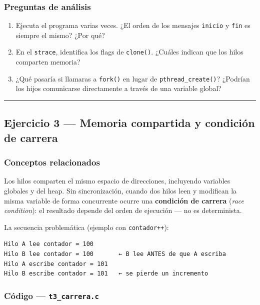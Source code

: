 \documentclass[
  spanish,
]{article}
\providecommand{\tightlist}{%
  \setlength{\itemsep}{0pt}\setlength{\parskip}{0pt}}
\begin{document}
\subsubsection{Preguntas de análisis}\label{preguntas-de-anuxe1lisis-1}

\begin{enumerate}
\def\labelenumi{\arabic{enumi}.}
\tightlist
\item
  Ejecuta el programa varias veces. ¿El orden de los mensajes
  \texttt{inicio} y \texttt{fin} es siempre el mismo? ¿Por qué?
\item
  En el \texttt{strace}, identifica los flags de \texttt{clone()}.
  ¿Cuáles indican que los hilos comparten memoria?
\item
  ¿Qué pasaría si llamaras a \texttt{fork()} en lugar de
  \texttt{pthread\_create()}? ¿Podrían los hijos comunicarse
  directamente a través de una variable global?
\end{enumerate}

\begin{center}\rule{0.5\linewidth}{0.5pt}\end{center}

\subsection{Ejercicio 3 --- Memoria compartida y condición de
carrera}\label{ejercicio-3-memoria-compartida-y-condiciuxf3n-de-carrera}

\subsubsection{Conceptos relacionados}\label{conceptos-relacionados-2}

Los hilos comparten el mismo espacio de direcciones, incluyendo
variables globales y del heap. Sin sincronización, cuando dos hilos leen
y modifican la misma variable de forma concurrente ocurre una
\textbf{condición de carrera} (\emph{race condition}): el resultado
depende del orden de ejecución --- no es determinista.

La secuencia problemática (ejemplo con \texttt{contador++}):

\begin{verbatim}
Hilo A lee contador = 100
Hilo B lee contador = 100       ← B lee ANTES de que A escriba
Hilo A escribe contador = 101
Hilo B escribe contador = 101   ← se pierde un incremento
\end{verbatim}

\subsubsection{\texorpdfstring{Código ---
\texttt{t3\_carrera.c}}{Código --- t3\_carrera.c}}\label{cuxf3digo-t3_carrera.c}
\end{document}
